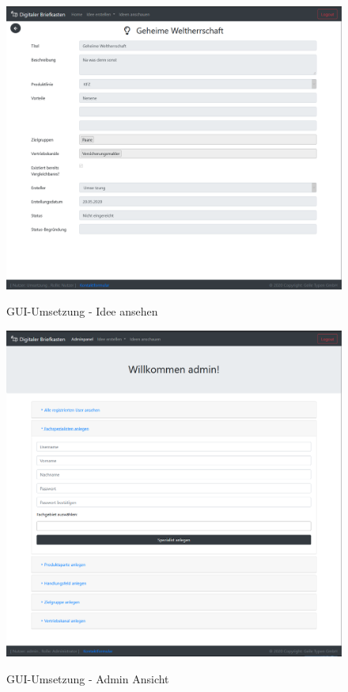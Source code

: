 \begin{figure}[h]
\centering
\begin{minipage}[t]{1\textwidth} 
\caption{GUI-Umsetzung - Idee ansehen } 
\includegraphics[width=1\textwidth]{img/idee-umsetzung.png}\\
\end{minipage}
\end{figure}

\begin{figure}[h]
\centering
\begin{minipage}[t]{1\textwidth} 
\caption{GUI-Umsetzung - Admin Ansicht } 
\includegraphics[width=1\textwidth]{img/admin-umsetzung.png}\\
\end{minipage}
\end{figure}


